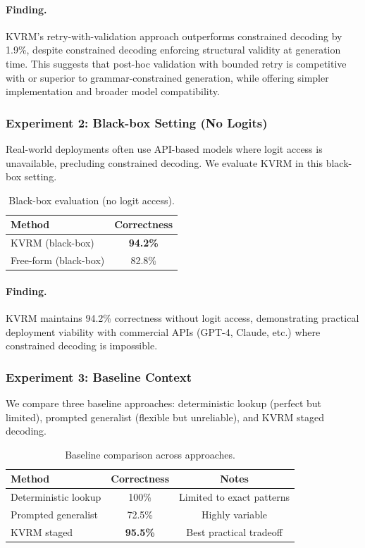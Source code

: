 \documentclass[11pt]{article}
\begin{document}
\paragraph{Finding.} KVRM's retry-with-validation approach outperforms constrained decoding by 1.9\%, despite constrained decoding enforcing structural validity at generation time. This suggests that post-hoc validation with bounded retry is competitive with or superior to grammar-constrained generation, while offering simpler implementation and broader model compatibility.

\subsubsection{Experiment 2: Black-box Setting (No Logits)}

Real-world deployments often use API-based models where logit access is unavailable, precluding constrained decoding. We evaluate KVRM in this black-box setting.

\begin{table}[h]
\centering
\caption{Black-box evaluation (no logit access).}
\label{tab:exp2_blackbox}
\begin{tabular}{lc}
\toprule
Method & Correctness \\
\midrule
KVRM (black-box) & \textbf{94.2\%} \\
Free-form (black-box) & 82.8\% \\
\bottomrule
\end{tabular}
\end{table}

\paragraph{Finding.} KVRM maintains 94.2\% correctness without logit access, demonstrating practical deployment viability with commercial APIs (GPT-4, Claude, etc.) where constrained decoding is impossible.

\subsubsection{Experiment 3: Baseline Context}

We compare three baseline approaches: deterministic lookup (perfect but limited), prompted generalist (flexible but unreliable), and KVRM staged decoding.

\begin{table}[h]
\centering
\caption{Baseline comparison across approaches.}
\label{tab:exp3_baseline}
\begin{tabular}{lcc}
\toprule
Method & Correctness & Notes \\
\midrule
Deterministic lookup & 100\% & Limited to exact patterns \\
Prompted generalist & 72.5\% & Highly variable \\
KVRM staged & \textbf{95.5\%} & Best practical tradeoff \\
\bottomrule
\end{tabular}
\end{table}
\end{document}
